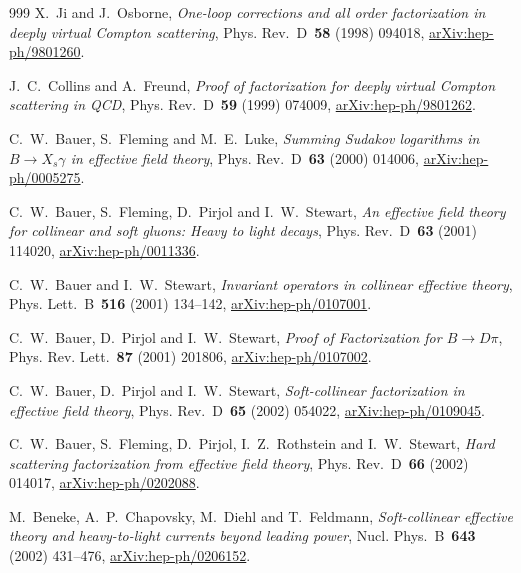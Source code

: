 \begin{thebibliography}{999}
X.~Ji and J.~Osborne, \emph{One-loop corrections and all order factorization in deeply virtual Compton scattering}, Phys. Rev.~D~\textbf{58} (1998) \mbox{094018}, \href{https://arxiv.org/abs/hep-ph/9801260}{arXiv:hep-ph/9801260}.

J.~C.~Collins and A.~Freund, \emph{Proof of factorization for deeply virtual Compton scattering in QCD}, Phys. Rev.~D~\textbf{59} (1999) \mbox{074009}, \href{https://arxiv.org/abs/hep-ph/9801262}{arXiv:hep-ph/9801262}.

C.~W.~Bauer, S.~Fleming and M.~E.~Luke, \emph{Summing Sudakov logarithms in $B\to X_s\gamma$ in effective field theory}, Phys. Rev.~D~\textbf{63} (2000) \mbox{014006}, \href{https://arxiv.org/abs/hep-ph/0005275}{arXiv:hep-ph/0005275}.

C.~W.~Bauer, S.~Fleming, D.~Pirjol and I.~W.~Stewart, \emph{An effective field theory for collinear and soft gluons: Heavy to light decays}, Phys. Rev.~D~\textbf{63} (2001) \mbox{114020}, \href{https://arxiv.org/abs/hep-ph/0011336}{arXiv:hep-ph/0011336}.

C.~W.~Bauer and I.~W.~Stewart, \emph{Invariant operators in collinear effective theory}, Phys. Lett.~B~\textbf{516} (2001) \mbox{134--142}, \href{https://arxiv.org/abs/hep-ph/0107001}{arXiv:hep-ph/0107001}.

C.~W.~Bauer, D.~Pirjol and I.~W.~Stewart, \emph{Proof of Factorization for $B\to D\pi$}, Phys. Rev. Lett.~\textbf{87} (2001) \mbox{201806}, \href{https://arxiv.org/abs/hep-ph/0107002}{arXiv:hep-ph/0107002}.

C.~W.~Bauer, D.~Pirjol and I.~W.~Stewart, \emph{Soft-collinear factorization in effective field theory}, Phys. Rev.~D~\textbf{65} (2002) \mbox{054022}, \href{https://arxiv.org/abs/hep-ph/0109045}{arXiv:hep-ph/0109045}.

C.~W.~Bauer, S.~Fleming, D.~Pirjol, I.~Z.~Rothstein and I.~W.~Stewart, \emph{Hard scattering factorization from effective field theory}, Phys. Rev.~D~\textbf{66} (2002) \mbox{014017}, \href{https://arxiv.org/abs/hep-ph/0202088}{arXiv:hep-ph/0202088}.

M.~Beneke, A.~P.~Chapovsky, M.~Diehl and T.~Feldmann, \emph{Soft-collinear effective theory and heavy-to-light currents beyond leading power}, Nucl. Phys.~B~\textbf{643} (2002) \mbox{431--476}, \href{https://arxiv.org/abs/hep-ph/0206152}{arXiv:hep-ph/0206152}.


\end{thebibliography}
